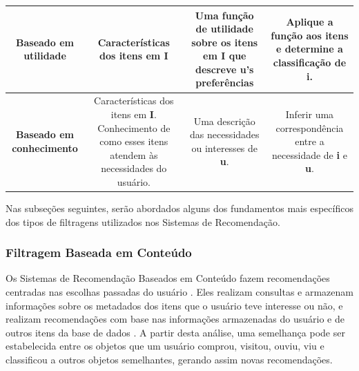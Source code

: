 \begin{table}[]
\begin{tabular}{|c|c|c|c|}
	\rowcolor[HTML]{EFEFEF} 
	\textbf{Baseado em utilidade} & \begin{minipage} [t] {0.2\textwidth} \centering Características dos itens em \textbf{I} \end{minipage}  & \begin{minipage} [t] {0.2\textwidth} 
		Uma função de utilidade sobre os itens em \textbf{I} que descreve \textbf{u}'s preferências \end{minipage}   & \begin{minipage} [t] {0.2\textwidth} Aplique a função aos itens e determine a classificação de \textbf{i}.  \end{minipage}  \\ \hline
	\textbf{Baseado em conhecimento}  & \begin{minipage} [t] {0.2\textwidth} \centering Características dos itens em \textbf{I}. Conhecimento de como esses itens atendem às necessidades do usuário.  \end{minipage}  & \begin{minipage} [t] {0.2\textwidth} Uma descrição das necessidades ou interesses de \textbf{u}.\end{minipage}  &  \begin{minipage} [t] {0.2\textwidth}  
		Inferir uma correspondência entre a necessidade de \textbf{i} e \textbf{u}. \end{minipage} \\ \hline
	\end{tabular}
\end{table}



Nas subseções seguintes, serão abordados alguns dos fundamentos mais específicos dos tipos de filtragens utilizados nos Sistemas de Recomendação.


\subsubsection{Filtragem Baseada em Conteúdo}


Os Sistemas de Recomendação Baseados em Conteúdo fazem recomendações centradas nas escolhas passadas do usuário \cite{bobadilla2013}. 
Eles realizam consultas e armazenam informações sobre os metadados dos itens que o usuário teve interesse ou não, e realizam recomendações 
com base nas informações armazenadas do usuário e de outros itens da base de dados \cite{mauricio}. A partir desta análise, uma semelhança pode ser
estabelecida entre os objetos que um usuário comprou, visitou, ouviu, viu e classificou a outros objetos semelhantes, gerando assim novas recomendações. 

